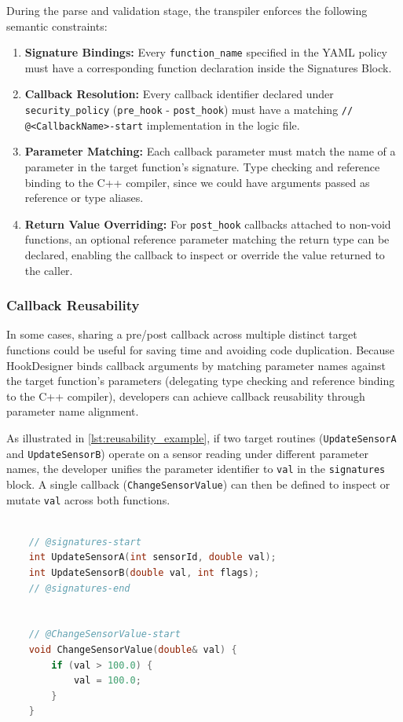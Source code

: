 During the parse and validation stage, the transpiler enforces the following semantic constraints:
\begin{enumerate}
	\item \textbf{Signature Bindings:} Every \texttt{function\_name} specified in the YAML policy must have a corresponding function declaration inside the Signatures Block.
	\item \textbf{Callback Resolution:} Every callback identifier declared under \texttt{security\_policy} (\texttt{pre\_hook} - \texttt{post\_hook}) must have a matching \texttt{// @<CallbackName>-start} implementation in the logic file.
	\item \textbf{Parameter Matching:} Each callback parameter must match the name of a parameter in the target function's signature. Type checking and reference binding to the C++ compiler, since we could have arguments passed as reference or type aliases.
	\item \textbf{Return Value Overriding:} For \texttt{post\_hook} callbacks attached to non-void functions, an optional reference parameter matching the return type can be declared, enabling the callback to inspect or override the value returned to the caller.
\end{enumerate}

\subsubsection{Callback Reusability}

In some cases, sharing a pre/post callback across multiple distinct target functions could be useful for saving time and avoiding code duplication.
Because HookDesigner binds callback arguments by matching parameter names against the target function's parameters (delegating type checking and reference binding to the C++ compiler), developers can achieve callback reusability through parameter name alignment.

As illustrated in \cref{lst:reusability_example}, if two target routines (\texttt{UpdateSensorA} and \texttt{UpdateSensorB}) operate on a sensor reading under different parameter names, the developer unifies the parameter identifier to \texttt{val} in the \texttt{signatures} block. A single callback (\texttt{ChangeSensorValue}) can then be defined to inspect or mutate \texttt{val} across both functions.

\begin{lstlisting}[language=C++, caption={C++ user logic file illustrating callback reusability.}, label={lst:reusability_example}, basicstyle=\ttfamily\footnotesize, breaklines=true]
	
	// @signatures-start
	int UpdateSensorA(int sensorId, double val);
	int UpdateSensorB(double val, int flags);    
	// @signatures-end
	
	
	// @ChangeSensorValue-start
	void ChangeSensorValue(double& val) {
		if (val > 100.0) {
			val = 100.0;
		}
	}
\end{lstlisting}

